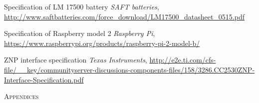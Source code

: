 \documentclass[a4paper,12pt,english]{article}
\begin{document}
\begin{thebibliography}{9}
Specification of LM 17500 battery
\emph{SAFT batteries},
\url{http://www.saftbatteries.com/force_download/LM17500_datasheet_0515.pdf}

Specification of Raspberry model 2
\emph{Raspberry Pi},
\url{https://www.raspberrypi.org/products/raspberry-pi-2-model-b/}

ZNP interface specification
\emph{Texas Instruments},
\url{http://e2e.ti.com/cfs-file/__key/communityserver-discussions-components-files/158/3286.CC2530ZNP-Interface-Specification.pdf}


\end{thebibliography}


\clearpage
\textsc{\huge Appendices}
\appendix
\end{document}
